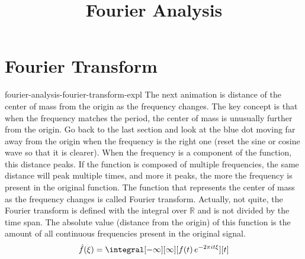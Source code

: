 \documentclass[preview]{standalone}
\begin{document}
\title{Fourier Analysis}
\genpage

\section{Fourier Transform}

\begin{snippet}{fourier-analysis-fourier-transform-expl}
    The next animation is distance of the center of mass from the origin as the frequency changes.
    The key concept is that when the frequency matches the period, the center of mass is unusually further from the origin.
    Go back to the last section and look at the blue dot moving far away from the origin when the frequency is the right one
    (reset the sine or cosine wave so that it is clearer). When the frequency is a component of the function, this distance peaks.
    If the function is composed of multiple frequencies, the same distance will peak multiple times, and more it peaks,
    the more the frequency is present in the original function.
    The function that represents the center of mass as the frequency changes is called Fourier transform.
    Actually, not quite, the Fourier transform is defined with the integral over \(\mathbb{R}\)
    and is not divided by the time span. The absolute value (distance from the origin) of this function
    is the amount of all continuous frequencies present in the original signal.
    \[
        \hat{f}(\xi)=\integral[-\infty][\infty][f(t)\,e^{-2\pi it\xi}][t]
    \]
\end{snippet}

\end{document}
